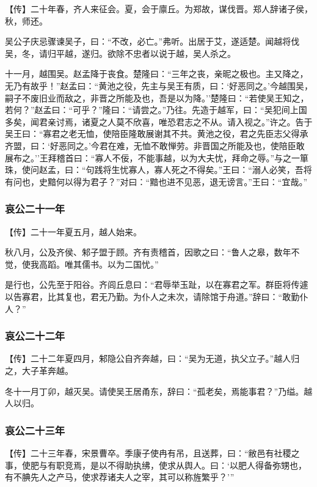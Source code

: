\documentclass[]{article}
\begin{document}
【传】二十年春，齐人来征会。夏，会于廪丘。为郑故，谋伐晋。郑人辞诸子侯，秋，师还。

吴公子庆忌骤谏吴子，曰：``不改，必亡。''弗听。出居于艾，遂适楚。闻越将伐吴，冬，请归平越，遂归。欲除不忠者以说于越，吴人杀之。

十一月，越围吴。赵孟降于丧食。楚隆曰：``三年之丧，亲昵之极也。主又降之，无乃有故乎！''赵孟曰：``黄池之役，先主与吴王有质，曰：`好恶同之。'今越围吴，嗣子不废旧业而敌之，非晋之所能及也，吾是以为降。''楚隆曰：``若使吴王知之，若何？''赵孟曰：``可乎？''隆曰：``请尝之。''乃往。先造于越军，曰：``吴犯间上国多矣，闻君亲讨焉，诸夏之人莫不欣喜，唯恐君志之不从。请入视之。''许之。告于吴王曰：``寡君之老无恤，使陪臣隆敢展谢其不共。黄池之役，君之先臣志父得承齐盟，曰：`好恶同之。'今君在难，无恤不敢惮劳。非晋国之所能及也，使陪臣敢展布之。''王拜稽首曰：``寡人不佞，不能事越，以为大夫忧，拜命之辱。''与之一箪珠，使问赵孟，曰：``句践将生忧寡人，寡人死之不得矣。''王曰：``溺人必笑，吾将有问也，史黯何以得为君子？''对曰：``黯也进不见恶，退无谤言。''王曰：``宜哉。''

\hypertarget{header-n3260}{%
\subsubsection{哀公二十一年}\label{header-n3260}}

【传】二十一年夏五月，越人始来。

秋八月，公及齐侯、邾子盟于顾。齐有责稽首，因歌之曰：``鲁人之皋，数年不觉，使我高蹈。唯其儒书。以为二国忧。''

是行也，公先至于阳谷。齐闾丘息曰：``君辱举玉趾，以在寡君之军。群臣将传遽以告寡君，比其复也，君无乃勤。为仆人之未次，请除馆于舟道。''辞曰：``敢勤仆人？''

\hypertarget{header-n3266}{%
\subsubsection{哀公二十二年}\label{header-n3266}}

【传】二十二年夏四月，邾隐公自齐奔越，曰：``吴为无道，执父立子。''越人归之，大子革奔越。

冬十一月丁卯，越灭吴。请使吴王居甬东，辞曰：``孤老矣，焉能事君？''乃缢。越人以归。

\hypertarget{header-n3271}{%
\subsubsection{哀公二十三年}\label{header-n3271}}

【传】二十三年春，宋景曹卒。季康子使冉有吊，且送葬，曰：``敝邑有社稷之事，使肥与有职竞焉，是以不得助执绋，使求从舆人。曰：`以肥人得备弥甥也，有不腆先人之产马，使求荐诸夫人之宰，其可以称旌繁乎？'''
\end{document}
